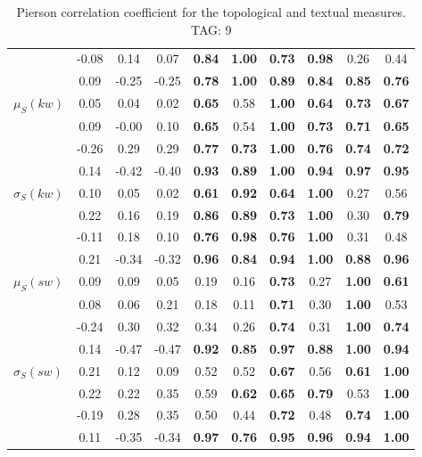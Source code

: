 \begin{table*}[h!]
\begin{center}
\begin{tabular}{| l || c | c | c | c | c | c | c | c | c |}
 & -0.08 & 0.14 & 0.07 & {\bf 0.84} & {\bf 1.00} & {\bf 0.73} & {\bf 0.98} & 0.26 & 0.44 \\
 & 0.09 & -0.25 & -0.25 & {\bf 0.78} & {\bf 1.00} & {\bf 0.89} & {\bf 0.84} & {\bf 0.85} & {\bf 0.76} \\\hline
$\mu_S(kw)$ & 0.05 & 0.04 & 0.02 & {\bf 0.65} & 0.58 & {\bf 1.00} & {\bf 0.64} & {\bf 0.73} & {\bf 0.67} \\
 & 0.09 & -0.00 & 0.10 & {\bf 0.65} & 0.54 & {\bf 1.00} & {\bf 0.73} & {\bf 0.71} & {\bf 0.65} \\
 & -0.26 & 0.29 & 0.29 & {\bf 0.77} & {\bf 0.73} & {\bf 1.00} & {\bf 0.76} & {\bf 0.74} & {\bf 0.72} \\
 & 0.14 & -0.42 & -0.40 & {\bf 0.93} & {\bf 0.89} & {\bf 1.00} & {\bf 0.94} & {\bf 0.97} & {\bf 0.95} \\\hline
$\sigma_S(kw)$ & 0.10 & 0.05 & 0.02 & {\bf 0.61} & {\bf 0.92} & {\bf 0.64} & {\bf 1.00} & 0.27 & 0.56 \\
 & 0.22 & 0.16 & 0.19 & {\bf 0.86} & {\bf 0.89} & {\bf 0.73} & {\bf 1.00} & 0.30 & {\bf 0.79} \\
 & -0.11 & 0.18 & 0.10 & {\bf 0.76} & {\bf 0.98} & {\bf 0.76} & {\bf 1.00} & 0.31 & 0.48 \\
 & 0.21 & -0.34 & -0.32 & {\bf 0.96} & {\bf 0.84} & {\bf 0.94} & {\bf 1.00} & {\bf 0.88} & {\bf 0.96} \\\hline
$\mu_S(sw)$ & 0.09 & 0.09 & 0.05 & 0.19 & 0.16 & {\bf 0.73} & 0.27 & {\bf 1.00} & {\bf 0.61} \\
 & 0.08 & 0.06 & 0.21 & 0.18 & 0.11 & {\bf 0.71} & 0.30 & {\bf 1.00} & 0.53 \\
 & -0.24 & 0.30 & 0.32 & 0.34 & 0.26 & {\bf 0.74} & 0.31 & {\bf 1.00} & {\bf 0.74} \\
 & 0.14 & -0.47 & -0.47 & {\bf 0.92} & {\bf 0.85} & {\bf 0.97} & {\bf 0.88} & {\bf 1.00} & {\bf 0.94} \\\hline
$\sigma_S(sw)$ & 0.21 & 0.12 & 0.09 & 0.52 & 0.52 & {\bf 0.67} & 0.56 & {\bf 0.61} & {\bf 1.00} \\
 & 0.22 & 0.22 & 0.35 & 0.59 & {\bf 0.62} & {\bf 0.65} & {\bf 0.79} & 0.53 & {\bf 1.00} \\
 & -0.19 & 0.28 & 0.35 & 0.50 & 0.44 & {\bf 0.72} & 0.48 & {\bf 0.74} & {\bf 1.00} \\
 & 0.11 & -0.35 & -0.34 & {\bf 0.97} & {\bf 0.76} & {\bf 0.95} & {\bf 0.96} & {\bf 0.94} & {\bf 1.00} \\\hline
\end{tabular}
\caption{Pierson correlation coefficient for the topological and textual measures. TAG: 9}
\end{center}
\end{table*}